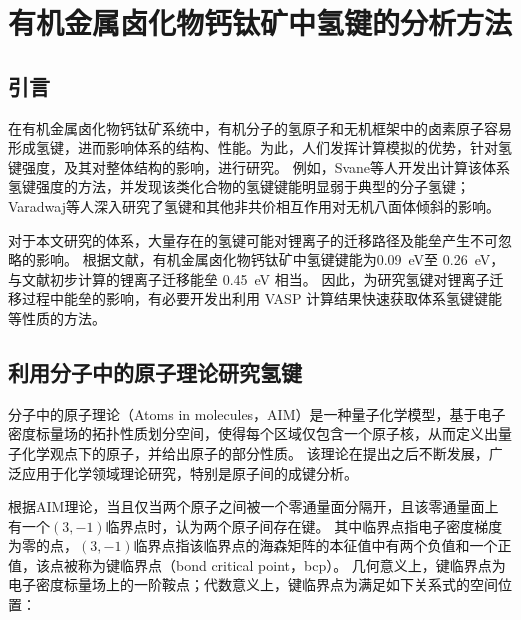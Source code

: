 \chapter{有机金属卤化物钙钛矿中氢键的分析方法}
\label{ch:bcp}

\section{引言}

在有机金属卤化物钙钛矿系统中，有机分子的氢原子和无机框架中的卤素原子容易形成氢键，进而影响体系的结构、性能。为此，人们发挥计算模拟的优势，针对氢键强度，及其对整体结构的影响，进行研究。
例如，Svane等人开发出计算该体系氢键强度的方法，并发现该类化合物的氢键键能明显弱于典型的分子氢键；
Varadwaj等人深入研究了氢键和其他非共价相互作用对无机八面体倾斜的影响。

对于本文研究的体系，大量存在的氢键可能对锂离子的迁移路径及能垒产生不可忽略的影响。
根据文献\cite{svaneHowStrongHydrogen2017}，有机金属卤化物钙钛矿中氢键键能为\SI{0.09}{eV}至 \SI{0.26}{eV}，与文献\cite{yinMetalChloridePerovskite2020}初步计算的锂离子迁移能垒 \SI{0.45}{eV} 相当。
因此，为研究氢键对锂离子迁移过程中能垒的影响，有必要开发出利用 VASP 计算结果快速获取体系氢键键能等性质的方法。

\section{利用分子中的原子理论研究氢键}

分子中的原子理论（Atoms in molecules，AIM）是一种量子化学模型，基于电子密度标量场的拓扑性质划分空间，使得每个区域仅包含一个原子核，从而定义出量子化学观点下的原子，并给出原子的部分性质。
该理论在提出之后不断发展，广泛应用于化学领域理论研究，特别是原子间的成键分析。

根据AIM理论，当且仅当两个原子之间被一个零通量面分隔开，且该零通量面上有一个$(3,-1)$临界点时，认为两个原子间存在键。
其中临界点指电子密度梯度为零的点，$(3,-1)$临界点指该临界点的海森矩阵的本征值中有两个负值和一个正值，该点被称为键临界点（bond critical point，bcp）。
几何意义上，键临界点为电子密度标量场上的一阶鞍点；代数意义上，键临界点为满足如下关系式的空间位置：

